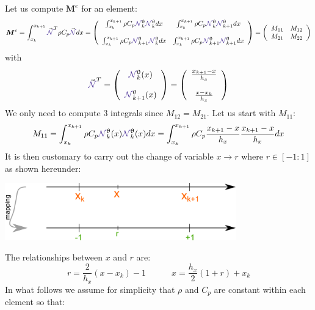 Let us compute ${\bm M}^e$ for an element:
\[
{\bm M}^e
= \int_{x_k}^{x_{k+1}}   {\vec {\color{Violet}\bN}}^T \rho C_p {\vec {\color{Violet}\bN}} dx  
=
\left(
\begin{array}{cc}
\int_{x_k}^{x_{k+1}} \rho C_p {\color{Violet}\bN}_k^\uptheta {\color{Violet}\bN}_{k}^\uptheta dx   
&  \int_{x_k}^{x_{k+1}} \rho C_p {\color{Violet}\bN}_k^\uptheta {\color{Violet}\bN}_{k+1}^\uptheta dx \\ \\
\int_{x_k}^{x_{k+1}} \rho C_p {\color{Violet}\bN}_{k+1}^\uptheta {\color{Violet}\bN}_{k}^\uptheta dx  
&  \int_{x_k}^{x_{k+1}} \rho C_p {\color{Violet}\bN}_{k+1}^\uptheta {\color{Violet}\bN}_{k+1}^\uptheta dx 
\end{array}
\right)
=
\left(
\begin{array}{cc}
M_{11} & M_{12} \\
M_{21} & M_{22} 
\end{array}
\right)
\]
with 
\[
{\vec {\color{Violet}\bN}}^T = 
\left(
\begin{array}{c}
{\color{Violet}\bN}_k^\uptheta(x)  \\ \\  
{\color{Violet}\bN}_{k+1}^\uptheta(x)
\end{array}
\right)
=
\left(
\begin{array}{c}
\frac{x_{k+1}-x}{h_x}   \\ \\
\frac{x-x_k}{h_x} 
\end{array}
\right)
\]
We only need to compute 3 integrals since $M_{12}=M_{21}$.
Let us start with $M_{11}$:
\[
M_{11}=\int_{x_k}^{x_{k+1}} \rho C_p {\color{Violet}\bN}_k^\uptheta(x) 
{\color{Violet}\bN}_{k}^\uptheta(x) dx
=   
\int_{x_k}^{x_{k+1}} \rho C_p 
\frac{x_{k+1}-x}{h_x}  
\frac{x_{k+1}-x}{h_x}  
dx
\]
It is then customary to carry out the change of variable $x \rightarrow r$ where 
$r \in [-1:1]$ as shown hereunder:
\begin{center}
\includegraphics[width=10cm]{images/oneD/el1D_mapping}
\end{center}
The relationships between $x$ and $r$ are:
\[
r=\frac{2}{h_x}(x-x_k)-1
\quad\quad\quad
x=\frac{h_x}{2}(1+r)+x_k
\]
In what follows we assume for simplicity that $\rho$ and $C_p$ are constant within each element so that:
